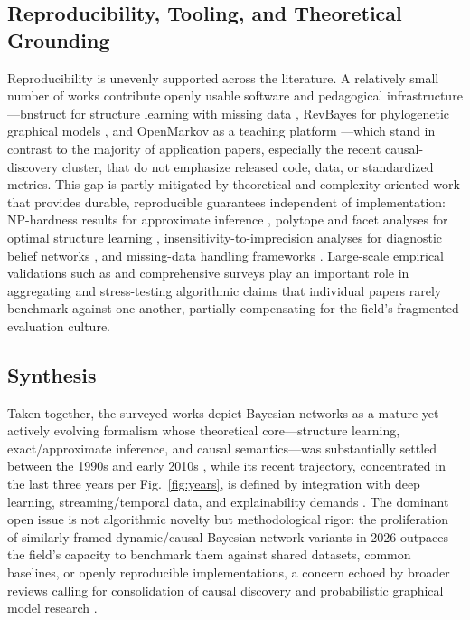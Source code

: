 \subsection{Reproducibility, Tooling, and Theoretical Grounding}
Reproducibility is unevenly supported across the literature. A relatively small number of works contribute openly usable software and pedagogical infrastructure---bnstruct for structure learning with missing data \cite{franzin2016bnstruct}, RevBayes for phylogenetic graphical models \cite{hohna2016revbayes}, and OpenMarkov as a teaching platform \cite{diez2022teaching}---which stand in contrast to the majority of application papers, especially the recent causal-discovery cluster, that do not emphasize released code, data, or standardized metrics. This gap is partly mitigated by theoretical and complexity-oriented work that provides durable, reproducible guarantees independent of implementation: NP-hardness results for approximate inference \cite{dagum1993approximating}, polytope and facet analyses for optimal structure learning \cite{cussens2017bayesian}, insensitivity-to-imprecision analyses for diagnostic belief networks \cite{henrion2013why}, and missing-data handling frameworks \cite{mohan2013graphical,franzin2016bnstruct}. Large-scale empirical validations such as \cite{constantinou2021large} and comprehensive surveys \cite{kitson2023survey,zhou2011structure,salmeron2018review} play an important role in aggregating and stress-testing algorithmic claims that individual papers rarely benchmark against one another, partially compensating for the field's fragmented evaluation culture.

\subsection{Synthesis}
Taken together, the surveyed works depict Bayesian networks as a mature yet actively evolving formalism whose theoretical core---structure learning, exact/approximate inference, and causal semantics---was substantially settled between the 1990s and early 2010s \cite{dagum1993approximating,zhang1996exploiting,tsamardinos2006max,singh2018finding,murphy2013loopy,darwiche2013conditioning}, while its recent trajectory, concentrated in the last three years per Fig.~\ref{fig:years}, is defined by integration with deep learning, streaming/temporal data, and explainability demands \cite{zhang2026causal,zhang2026neuro,zhang2026adaptive,nicora2024bayesian,kim2025understanding}. The dominant open issue is not algorithmic novelty but methodological rigor: the proliferation of similarly framed dynamic/causal Bayesian network variants in 2026 outpaces the field's capacity to benchmark them against shared datasets, common baselines, or openly reproducible implementations, a concern echoed by broader reviews calling for consolidation of causal discovery and probabilistic graphical model research \cite{gao2026bayesian,revista2026network,geetha2023understanding}.

